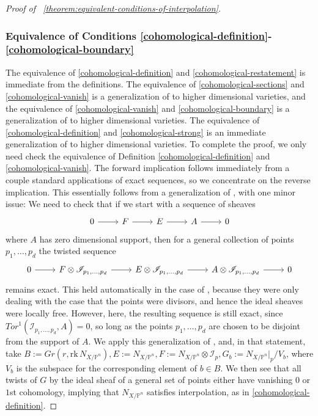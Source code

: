 \documentclass[reqno, 11pt]{amsart}
\theoremstyle{definition}
\theoremstyle{remark}
\numberwithin{equation}{section}
\numberwithin{thm}{section}
\numberwithin{prop}{section}
\numberwithin{lem}{section}
\numberwithin{cor}{section}
\numberwithin{conj}{section}
\numberwithin{defn}{section}
\newcommand{\rk}{{\text{rk}\,}}
\theoremstyle{plain}
\theoremstyle{definition}
\newcommand\sssec{\subsubsection}
\newcommand\bp{{\mathbb P}}
\newcommand\sci{\mathscr I}
\newcommand \stor{\textit{Tor}}
\begin{document}
\begin{proof}[Proof of ~\autoref{theorem:equivalent-conditions-of-interpolation}]
\sssec{Equivalence of Conditions \ref{cohomological-definition}-\ref{cohomological-boundary}}

The equivalence of \ref{cohomological-definition}
and \ref{cohomological-restatement} is immediate from 
the definitions.
The equivalence of \ref{cohomological-sections}
and \ref{cohomological-vanish}
is a generalization of \cite[Proposition 4.5]{atanasovLY:interpolation-for-normal-bundles-of-general-curves}
to higher dimensional varieties, and the
equivalence of \ref{cohomological-vanish} and
\ref{cohomological-boundary}
is a generalization of \cite[Proposition 4.6]{atanasovLY:interpolation-for-normal-bundles-of-general-curves}
to higher dimensional varieties.
The equivalence of \ref{cohomological-definition}
and \ref{cohomological-strong} is an immediate
generalization of \cite[Theorem 8.1]{atanasov:interpolation-and-vector-bundles-on-curves} to higher dimensional varieties.
To complete the proof, we only need check the equivalence of
Definition \ref{cohomological-definition}
and \ref{cohomological-vanish}.
The forward implication follows immediately from a
couple standard applications of exact sequences,
so we concentrate on the reverse implication.
This essentially follows from a generalization of
\cite[Proposition 4.23]{atanasovLY:interpolation-for-normal-bundles-of-general-curves}, with one minor issue:
We need to check that if we start with a sequence of
	sheaves
	\begin{equation}
		\nonumber
		\begin{tikzcd}
		  0 \ar{r} & F \ar{r} & E \ar{r} & A \ar{r} & 0 
		\end{tikzcd}\end{equation}
	where $A$ has zero dimensional support, then for a general
	collection of points $p_1, \ldots, p_d$ the twisted
	sequence
	\begin{equation}
		\nonumber
		\begin{tikzcd}
		  0 \ar{r} & F \otimes \sci_{p_1, \ldots, p_d} \ar{r} & E \otimes \sci_{p_1, \ldots, p_d}\ar{r} & A \otimes \sci_{p_1, \ldots, p_d}\ar{r} & 0 
		\end{tikzcd}\end{equation}
	remains exact. This held automatically in the case of
\cite[Proposition 4.23]{atanasovLY:interpolation-for-normal-bundles-of-general-curves}, because they were only dealing with the case that the
points were divisors, and hence the ideal sheaves were locally free.
However, here, the resulting sequence is still exact, since
$\stor^1(\sci_{p_1, \ldots, p_d}, A) = 0$,
so long as the points $p_1, \ldots, p_d$ are chosen
to be disjoint from the support of $A$.
We apply this generalization of \cite[Proposition 4.23]{atanasovLY:interpolation-for-normal-bundles-of-general-curves},
and, in that statement,
take $B := Gr(r, \rk N_{X/\bp^n}), E := N_{X/\bp^n}, F := N_{X/\bp^n} \otimes \sci_p, G_b := N_{X/\bp^n}|_p/V_b$,
where 
$V_b$ is the subspace for the corresponding element of $b \in B$.
We then see that all twists of $G$ by the ideal sheaf of a general
set of points either have vanishing $0$ or $1$st cohomology,
implying that $N_{X/\bp^n}$ satisfies interpolation, as in
\ref{cohomological-definition}.
	


\end{proof}
\end{document}
